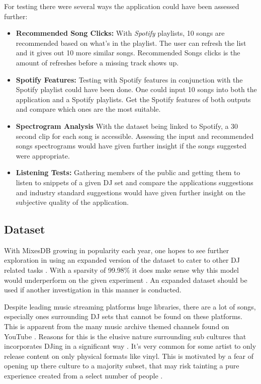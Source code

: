 For testing there were several ways the application could have been assessed further:
\begin{itemize}
	
\item \textbf{Recommended Song Clicks:} With \textit{Spotify} playlists, 10 songs are recommended based on what's in the playlist. The user can refresh the list and it gives out 10 more similar songs. Recommended Songs clicks is the amount of refreshes before a missing track shows up.

\item \textbf{Spotify Features:} Testing with Spotify features in conjunction with the Spotify playlist could have been done. One could input 10 songs into both the  application and a Spotify playlists. Get the Spotify features of both outputs and compare which ones are the most suitable.

\item \textbf{Spectrogram Analysis} With the dataset being linked to Spotify, a 30 second clip for each song is accessible. Assessing the input and recommended songs spectrograms would have given further insight if the songs suggested were appropriate.

\item \textbf{Listening Tests:} Gathering members of the public and getting them to listen to snippets of a given DJ set and compare the applications suggestions and industry standard suggestions would have given further insight on the subjective quality of the application.
\end{itemize}

\subsection{Dataset}
With MixesDB growing in popularity each year, one hopes to see further exploration in using an expanded version of the dataset to cater to other DJ related tasks \citep{similarweb_mixesdbcom_2023}. With a sparsity of 99.98\% it does make sense why this model would underperform on the given experiment \citep{zhang2020alleviating}. An expanded dataset should be used if another investigation in this manner is conducted. 

Despite leading music streaming platforms huge libraries, there are a lot of songs, especially ones surrounding DJ sets that cannot be found on these platforms. This is apparent from the many music archive themed channels found on YouTube \citep{allen_djs_2021}.  Reasons for this is the elusive nature surrounding sub cultures that incorporates DJing in a significant way \citep{reynolds_energy_2013}. It's very common for some artist to only release content on only physical formats like vinyl. This is motivated by a fear of opening up there culture to a majority subset, that may risk tainting a pure experience created from a select number of people \citep{wheeler_gentrification_2020}. 

